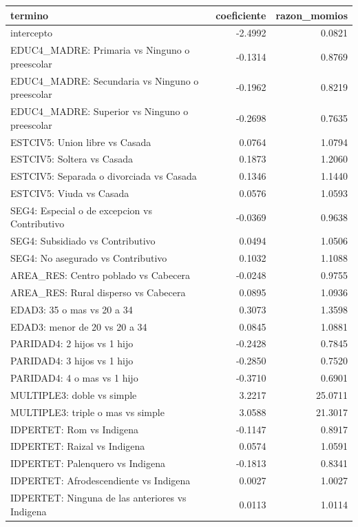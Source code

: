 \begin{tabular}{lrr}
\toprule
termino & coeficiente & razon\_momios \\
\midrule
intercepto & -2.4992 & 0.0821 \\
EDUC4\_MADRE: Primaria vs Ninguno o preescolar & -0.1314 & 0.8769 \\
EDUC4\_MADRE: Secundaria vs Ninguno o preescolar & -0.1962 & 0.8219 \\
EDUC4\_MADRE: Superior vs Ninguno o preescolar & -0.2698 & 0.7635 \\
ESTCIV5: Union libre vs Casada & 0.0764 & 1.0794 \\
ESTCIV5: Soltera vs Casada & 0.1873 & 1.2060 \\
ESTCIV5: Separada o divorciada vs Casada & 0.1346 & 1.1440 \\
ESTCIV5: Viuda vs Casada & 0.0576 & 1.0593 \\
SEG4: Especial o de excepcion vs Contributivo & -0.0369 & 0.9638 \\
SEG4: Subsidiado vs Contributivo & 0.0494 & 1.0506 \\
SEG4: No asegurado vs Contributivo & 0.1032 & 1.1088 \\
AREA\_RES: Centro poblado vs Cabecera & -0.0248 & 0.9755 \\
AREA\_RES: Rural disperso vs Cabecera & 0.0895 & 1.0936 \\
EDAD3: 35 o mas vs 20 a 34 & 0.3073 & 1.3598 \\
EDAD3: menor de 20 vs 20 a 34 & 0.0845 & 1.0881 \\
PARIDAD4: 2 hijos vs 1 hijo & -0.2428 & 0.7845 \\
PARIDAD4: 3 hijos vs 1 hijo & -0.2850 & 0.7520 \\
PARIDAD4: 4 o mas vs 1 hijo & -0.3710 & 0.6901 \\
MULTIPLE3: doble vs simple & 3.2217 & 25.0711 \\
MULTIPLE3: triple o mas vs simple & 3.0588 & 21.3017 \\
IDPERTET: Rom vs Indigena & -0.1147 & 0.8917 \\
IDPERTET: Raizal vs Indigena & 0.0574 & 1.0591 \\
IDPERTET: Palenquero vs Indigena & -0.1813 & 0.8341 \\
IDPERTET: Afrodescendiente vs Indigena & 0.0027 & 1.0027 \\
IDPERTET: Ninguna de las anteriores vs Indigena & 0.0113 & 1.0114 \\
\bottomrule
\end{tabular}
